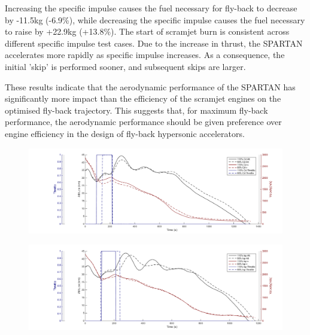 \documentclass[conf]{new-aiaa}
\begin{document}
Increasing the specific impulse causes the fuel necessary for fly-back to decrease by -11.5kg (-6.9\%), while decreasing the specific impulse causes the fuel necessary to raise by +22.9kg (+13.8\%). The start of scramjet burn is consistent across different specific impulse test cases. Due to the increase in thrust, the SPARTAN accelerates more rapidly as specific impulse increases. As a consequence, the initial 'skip' is performed sooner, and subsequent skips are larger. 

These results indicate that the aerodynamic performance of the SPARTAN has significantly more impact than the efficiency of the scramjet engines on the optimised fly-back trajectory. This suggests that, for maximum fly-back performance, the aerodynamic performance should be given preference over engine efficiency in the design of fly-back hypersonic accelerators. 

\begin{figure}[ht]
\centering
\includegraphics[width=0.9\linewidth]{Figures/CdVariation}
\caption{}
\label{fig:CdVariation}
\end{figure}

\begin{figure}[ht]
\centering
\includegraphics[width=0.9\linewidth]{Figures/IspVariation}
\caption{}
\label{fig:IspVariation}
\end{figure}
\end{document}
